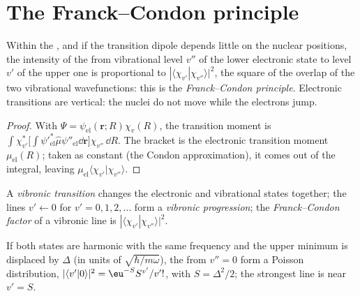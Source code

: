 \section{The Franck--Condon principle}

\begin{theorem}\label{thm:b3:electronic-spectroscopy:franck-condon}
Within the , and if the transition dipole
depends little on the nuclear positions, the intensity of the  from vibrational level $v''$ of the lower electronic state to level
$v'$ of the upper one is proportional to $|\langle\chi_{v'}|\chi_{v''}\rangle|^2$, the
square of the overlap of the two vibrational wavefunctions: this is the
\emph{Franck--Condon principle}. Electronic
transitions are vertical: the nuclei do not move while the electrons jump.
\end{theorem}

\begin{proof}
With $\Psi = \psi_{\mathrm{el}}(\mathbf r;R)\chi_v(R)$, the transition moment is
$\int\chi_{v'}^*\big[\int\psi'^*_{\mathrm{el}}\hat\mu\psi''_{\mathrm{el}}\dd\mathbf r\big]
\chi_{v''}\,\dd R$. The bracket is the electronic transition moment
$\mu_{\mathrm{el}}(R)$; taken as constant (the Condon approximation), it comes out of
the integral, leaving $\mu_{\mathrm{el}}\langle\chi_{v'}|\chi_{v''}\rangle$.
\end{proof}

\begin{definition}\label{def:b3:electronic-spectroscopy:vibronic}
A \emph{vibronic transition} changes the electronic
and vibrational states together; the lines $v' \leftarrow 0$ for $v' = 0, 1, 2,
\dots$ form a \emph{vibronic progression}; the
\emph{Franck--Condon factor} of a vibronic line is
$|\langle\chi_{v'}|\chi_{v''}\rangle|^2$.
\end{definition}

\begin{proposition}\label{prop:b3:electronic-spectroscopy:displaced}
If both states are harmonic with the same frequency and the upper minimum is
displaced by $\Delta$ (in units of $\sqrt{\hbar/m\omega}$), the  from $v'' = 0$ form a Poisson distribution,
$|\langle v'|0\rangle|^2 = \eu^{-S}S^{v'}/v'!$, with $S = \Delta^2/2$; the strongest line
is near $v' = S$.
\end{proposition}
\admitted

